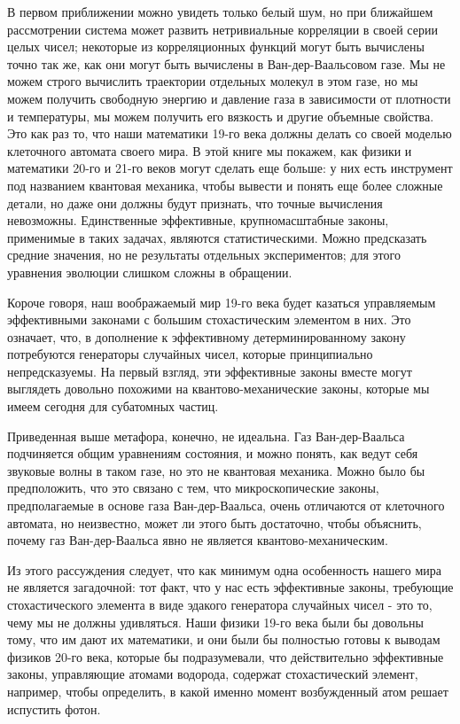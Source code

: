 \documentclass[main.tex]{subfiles}
\begin{document}
В первом приближении можно увидеть только белый шум, но при ближайшем рассмотрении система может развить нетривиальные корреляции в своей серии целых чисел; некоторые из корреляционных функций могут быть вычислены точно так же, как они могут быть вычислены в Ван-дер-Ваальсовом газе. Мы не можем строго вычислить траектории отдельных молекул в этом газе, но мы можем получить свободную энергию и давление газа в зависимости от плотности и температуры, мы можем получить его вязкость и другие объемные свойства. Это как раз то, что наши математики 19-го века должны делать со своей моделью клеточного автомата своего мира. В этой книге мы покажем, как физики и математики 20-го и 21-го веков могут сделать еще больше: у них есть инструмент под названием квантовая механика, чтобы вывести и понять еще более сложные детали, но даже они должны будут признать, что точные вычисления невозможны. Единственные эффективные, крупномасштабные законы, применимые в таких задачах, являются статистическими. Можно предсказать средние значения, но не результаты отдельных экспериментов; для этого уравнения эволюции слишком сложны в обращении. 

Короче говоря, наш воображаемый мир 19-го века будет казаться управляемым эффективными законами с большим стохастическим элементом в них. Это означает, что, в дополнение к эффективному детерминированному закону потребуются генераторы случайных чисел, которые принципиально непредсказуемы. На первый взгляд, эти эффективные законы вместе могут выглядеть довольно похожими на квантово-механические законы, которые мы имеем сегодня для субатомных частиц.

Приведенная выше метафора, конечно, не идеальна. Газ Ван-дер-Ваальса подчиняется общим уравнениям состояния, и можно понять, как ведут себя звуковые волны в таком газе, но это не квантовая механика. Можно было бы предположить, что это связано с тем, что микроскопические законы, предполагаемые в основе газа Ван-дер-Ваальса, очень отличаются от клеточного автомата, но неизвестно, может ли этого быть достаточно, чтобы объяснить, почему газ Ван-дер-Ваальса явно не является квантово-механическим. 

Из этого рассуждения следует, что как минимум одна особенность нашего мира не является загадочной: тот факт, что у нас есть эффективные законы, требующие стохастического элемента в виде эдакого генератора случайных чисел - это то, чему мы не должны удивляться. Наши физики 19-го века были бы довольны тому, что им дают их математики, и они были бы полностью готовы к выводам физиков 20-го века, которые бы подразумевали, что действительно эффективные законы, управляющие атомами водорода, содержат стохастический элемент, например, чтобы определить, в какой именно момент возбужденный атом решает испустить фотон. 
\end{document}
